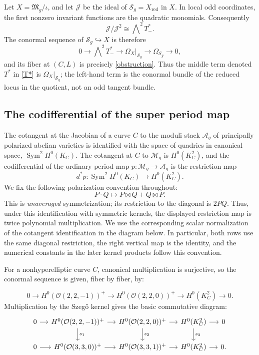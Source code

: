 \documentclass[11pt]{article}
\newcommand{\OO}{\mathcal O}
\newcommand{\MM}{\mathcal M}
\newcommand{\FM}{\mathfrak M}
\newcommand{\Aa}{\mathcal A}
\newcommand{\SSS}{\mathcal S}
\newcommand{\Sym}{\operatorname{Sym}}
\begin{document}
Let $X=\FM_g/\iota$, and let $\mathcal J$ be the ideal of
$\SSS_g=X_{\mathrm{red}}$ in $X$.  In {local odd coordinates,}
the first nonzero invariant functions are the quadratic monomials.
Consequently
\[
\mathcal J/\mathcal J^2\cong\bigwedge\nolimits^2T_-^*.
\]
The conormal sequence of $\SSS_g\hookrightarrow X$ is therefore
\[
0\longrightarrow\bigwedge\nolimits^2T_-^*
\longrightarrow\Omega_X\big|_{\SSS_g}
\longrightarrow\Omega_{\SSS_g}\longrightarrow0,
\]
and its fiber at $(C,L)$ is precisely \eqref{obstruction}.  Thus the
middle term denoted $T^*$ in \eqref{T*} is
$\Omega_X|_{\SSS_g}$; the left-hand term is the conormal bundle of the
reduced locus in the quotient, not an odd tangent bundle.


\subsection{The codifferential of the super period map}


The cotangent at the Jacobian of a curve $C$ to
the moduli stack $\Aa_g$ of principally polarized abelian varieties
is identified with the space of quadrics in canonical space, $\Sym^2 H^0(K_C)$.
The cotangent at $C$ to $\MM_g$ is $H^0(K_C^2)$, and the codifferential of the
ordinary period map $p:\MM_g\to \Aa_g$ is the restriction map
\[
d^*p: \Sym^2 H^0(K_C) \to H^0(K_C^2).
\]
\begingroup
We fix the following polarization convention throughout:
\[
P\cdot Q\longmapsto P\boxtimes Q+Q\boxtimes P.
\]
This is \emph{unaveraged} symmetrization; its restriction to the diagonal
is $2PQ$. Thus, under this identification with symmetric kernels, the
displayed restriction map is twice polynomial multiplication. We use
the corresponding scalar normalization of the cotangent identification
in the diagram below. In particular, both rows use the same diagonal
restriction, the right vertical map is the identity, and the numerical
constants in the later kernel products follow this convention.

For a nonhyperelliptic curve $C$, canonical multiplication is surjective,
so the conormal sequence is given, fiber by fiber, by:
\endgroup

\begin{equation}
0\to {H^0(\OO(2,2,-1))^+} \to {H^0(\OO(2,2,0))^+} \to H^0(K_C^2)\to 0.
\end{equation}
Multiplication by the Szeg\H{o} kernel gives the basic commutative diagram:
\begin{equation}
    \begin{tikzcd}[column sep=small]
0 \arrow[r] &
{H^0(\OO(2,2,-1))^+} \arrow[r] \arrow[d,"s_1"] &
{H^0(\OO(2,2,0))^+} \arrow[r] \arrow[d,"s_2"] &
H^0(K_C^2) \arrow[r] \arrow[d,"s_3"] &
0 \\
0 \arrow[r] &
{H^0(\OO(3,3,0))^+} \arrow[r] &
{H^0(\OO(3,3,1))^+} \arrow[r] &
H^0(K_C^2) \arrow[r] &
0.
\end{tikzcd}
\end{equation}
\end{document}
